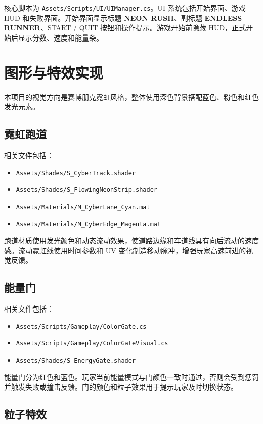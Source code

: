 \documentclass[UTF8,a4paper,12pt]{ctexart}
\begin{document}
核心脚本为 \texttt{Assets/Scripts/UI/UIManager.cs}。UI 系统包括开始界面、游戏 HUD 和失败界面。开始界面显示标题 \textbf{NEON RUSH}、副标题 \textbf{ENDLESS RUNNER}、START / QUIT 按钮和操作提示。游戏开始前隐藏 HUD，正式开始后显示分数、速度和能量条。

\section{图形与特效实现}

本项目的视觉方向是赛博朋克霓虹风格，整体使用深色背景搭配蓝色、粉色和红色发光元素。

\subsection{霓虹跑道}

相关文件包括：

\begin{itemize}
  \item \texttt{Assets/Shades/S\_CyberTrack.shader}
  \item \texttt{Assets/Shades/S\_FlowingNeonStrip.shader}
  \item \texttt{Assets/Materials/M\_CyberLane\_Cyan.mat}
  \item \texttt{Assets/Materials/M\_CyberEdge\_Magenta.mat}
\end{itemize}

跑道材质使用发光颜色和动态流动效果，使道路边缘和车道线具有向后流动的速度感。流动霓虹线使用时间参数和 UV 变化制造移动脉冲，增强玩家高速前进的视觉反馈。

\subsection{能量门}

相关文件包括：

\begin{itemize}
  \item \texttt{Assets/Scripts/Gameplay/ColorGate.cs}
  \item \texttt{Assets/Scripts/Gameplay/ColorGateVisual.cs}
  \item \texttt{Assets/Shades/S\_EnergyGate.shader}
\end{itemize}

能量门分为红色和蓝色。玩家当前能量模式与门颜色一致时通过，否则会受到惩罚并触发失败或撞击反馈。门的颜色和粒子效果用于提示玩家及时切换状态。

\subsection{粒子特效}
\end{document}
